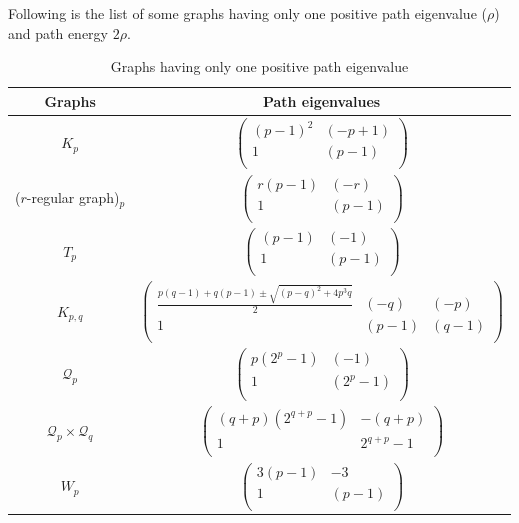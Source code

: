 \documentclass{article}
\newtheorem*{open problem*}{Open Problem}
\begin{document}
	\begin{center}
		Following is the list of some graphs having only one positive path eigenvalue ($\rho$) and path energy $2\rho$. 
		\begin{table}[ht]
			\renewcommand{\arraystretch}{1}
			\begin{tabular}{|c | c |} 
				\hline
				Graphs & Path eigenvalues \\ 
				\hline
				$K_p$ & $ \begin{pmatrix}
					(p-1)^2 & (-p+1) \\
					1 & (p-1) \\
				\end{pmatrix}$ \\ 
				\hline
				($r$-regular graph)$_p$ & $\begin{pmatrix}
					r(p-1) & (-r) \\
					1 & (p-1) \\
				\end{pmatrix}$ \\
				\hline
				$T_p$ &$\begin{pmatrix}
					(p-1) & (-1) \\
					1 & (p-1) \\
				\end{pmatrix}$ \\
				\hline
				$K_{p,q}$ & $\begin{pmatrix}
					\frac{p(q-1)+ q(p-1)\pm\sqrt{(p-q)^2+4p^3q}}{2} & (-q) & (-p)\\
					1 & (p-1) & (q-1)\\
				\end{pmatrix}$ \\
				\hline
				$\mathcal{Q}_{p}$ & $\begin{pmatrix}
					p(2^p-1) & (-1) \\
					1 & (2^p-1) \\
				\end{pmatrix}$ \\  
				\hline
				$\mathcal{Q}_{p}\times \mathcal{Q}_{q}$ & $\begin{pmatrix}
					(q+p)(2^{q+p}-1) & -(q+p) \\
					1 & 2^{q+p}-1 \\
				\end{pmatrix}$ \\
				\hline
				$W_p$ & $\begin{pmatrix}
					3(p-1) & -3 \\
					1 & (p-1) \\
				\end{pmatrix}$ \\
				\hline
			\end{tabular}
			\caption{\label{tab:Table 1}Graphs having only one positive path eigenvalue}
		\end{table}
	\end{center}        
\end{document}

